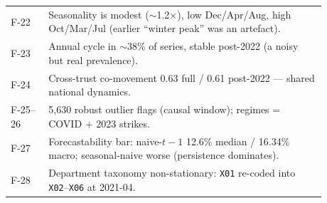 \documentclass[11pt,a4paper]{article}
\newcommand{\code}[1]{\texttt{\small #1}}
\begin{document}
\begin{longtable}{@{}l p{0.88\linewidth}@{}}
F-22 & Seasonality is modest ($\sim$1.2$\times$), low Dec/Apr/Aug, high Oct/Mar/Jul (earlier ``winter peak'' was an artefact). \\
F-23 & Annual cycle in $\sim$38\% of series, stable post-2022 (a noisy but real prevalence). \\
F-24 & Cross-trust co-movement 0.63 full / 0.61 post-2022 --- shared national dynamics. \\
F-25--26 & 5{,}630 robust outlier flags (causal window); regimes = COVID + 2023 strikes. \\
F-27 & Forecastability bar: naive-$t{-}1$ 12.6\% median / 16.34\% macro; seasonal-naive worse (persistence dominates). \\
F-28 & Department taxonomy non-stationary: \code{X01} re-coded into \code{X02}--\code{X06} at 2021-04. \\
\end{longtable}
\end{document}
